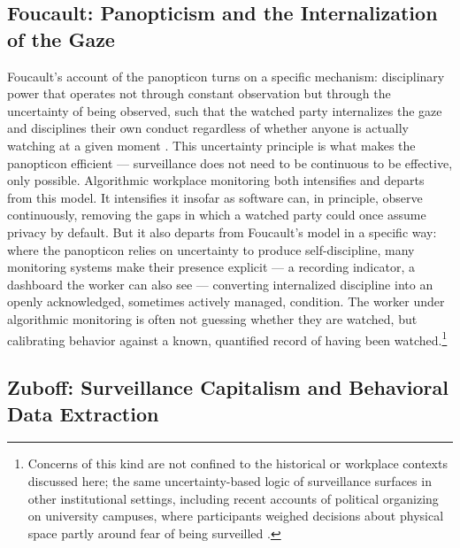 \documentclass[12pt, a4paper]{article}
\begin{document}
\subsection{Foucault: Panopticism and the Internalization of the Gaze}

Foucault's account of the panopticon turns on a specific mechanism: disciplinary power that operates not through constant observation but through the uncertainty of being observed, such that the watched party internalizes the gaze and disciplines their own conduct regardless of whether anyone is actually watching at a given moment \parencite{foucault1975discipline}. This uncertainty principle is what makes the panopticon efficient --- surveillance does not need to be continuous to be effective, only possible. Algorithmic workplace monitoring both intensifies and departs from this model. It intensifies it insofar as software can, in principle, observe continuously, removing the gaps in which a watched party could once assume privacy by default. But it also departs from Foucault's model in a specific way: where the panopticon relies on uncertainty to produce self-discipline, many monitoring systems make their presence explicit --- a recording indicator, a dashboard the worker can also see --- converting internalized discipline into an openly acknowledged, sometimes actively managed, condition. The worker under algorithmic monitoring is often not guessing whether they are watched, but calibrating behavior against a known, quantified record of having been watched.\footnote{Concerns of this kind are not confined to the historical or workplace contexts discussed here; the same uncertainty-based logic of surveillance surfaces in other institutional settings, including recent accounts of political organizing on university campuses, where participants weighed decisions about physical space partly around fear of being surveilled \parencite{iyer2026decolonial}.}

\subsection{Zuboff: Surveillance Capitalism and Behavioral Data Extraction}
\end{document}
